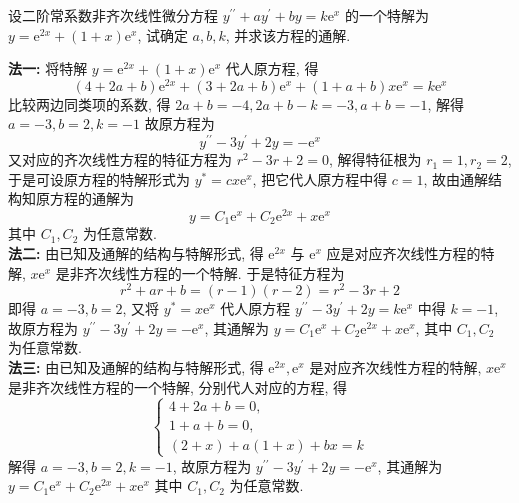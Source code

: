 \begin{example}[1993 数三]
    设二阶常系数非齐次线性微分方程 $ y^{\prime \prime}+a y^{\prime}+b y=k \mathrm{e}^{x} $ 的一个特解为 $ y=\mathrm{e}^{2 x}+(1+x) \mathrm{e}^{x} $, 试确定 $ a, b, k $, 并求该方程的通解. 
\end{example}
\begin{solution}
    \textbf{法一: }
    将特解 $ y=\mathrm{e}^{2 x}+(1+x) \mathrm{e}^{x} $ 代人原方程, 得
    $$(4+2 a+b) \mathrm{e}^{2 x}+(3+2 a+b) \mathrm{e}^{x}+(1+a+b) x \mathrm{e}^{x}=k \mathrm{e}^{x} $$
    比较两边同类项的系数, 得 $ 2 a+b=-4,2 a+b-k=-3, a+b=-1 $, 解得 $ a=-3 , b=2, k=-1 $ 故原方程为
    $$y^{\prime \prime}-3 y^{\prime}+2 y=-\mathrm{e}^{x} $$
    又对应的齐次线性方程的特征方程为 $ r^{2}-3 r+2=0 $, 解得特征根为 $ r_{1}=1, r_{2}=2 $, 于是可设原方程的特解形式为 $ y^{*}=c x \mathrm{e}^{x} $, 把它代人原方程中得 $ c=1 $, 故由通解结构知原方程的通解为 $$ y=C_{1} \mathrm{e}^{x}+C_{2} \mathrm{e}^{2 x}+x \mathrm{e}^{x}$$ 其中 $ C_{1}, C_{2} $ 为任意常数.\\ 
    \textbf{法二: }
    由已知及通解的结构与特解形式, 得 $ \mathrm{e}^{2 x} $ 与 $ \mathrm{e}^{x} $ 应是对应齐次线性方程的特解, $ x \mathrm{e}^{x} $ 是非齐次线性方程的一个特解. 于是特征方程为 $$ r^{2}+a r+b=(r-1)(r-2)=r^{2}-3 r+2$$ 
    即得 $ a=-3, b=2$, 又将 $ y^{*}=x \mathrm{e}^{x} $ 代人原方程 $ y^{\prime \prime}-3 y^{\prime}+2 y=k \mathrm{e}^{x} $ 中得 $ k=-1$, 故原方程为 $ y^{\prime \prime}-3 y^{\prime}+2 y=-\mathrm{e}^{x} $, 其通解为 $ y=C_{1} \mathrm{e}^{x}+C_{2} \mathrm{e}^{2 x}+x \mathrm{e}^{x} $, 其中 $ C_{1}, C_{2} $ 为任意常数.\\ 
    \textbf{法三: }由已知及通解的结构与特解形式, 得 $ \mathrm{e}^{2 x}, \mathrm{e}^{x} $ 是对应齐次线性方程的特解, $ x \mathrm{e}^{x} $ 是非齐次线性方程的一个特解, 分别代人对应的方程, 得 
    $$ \begin{cases}
        4+2 a+b=0, \\ 1+a+b=0, \\ (2+x)+a(1+x)+b x=k
    \end{cases}$$
    解得 $ a=-3, b=2, k=-1 $, 故原方程为 $ y^{\prime \prime}-3 y^{\prime}+   2 y=-\mathrm{e}^{x} $, 其通解为 $ y=C_{1} \mathrm{e}^{x}+C_{2} \mathrm{e}^{2 x}+x \mathrm{e}^{x} $ 其中 $ C_{1}, C_{2} $ 为任意常数.
\end{solution}

